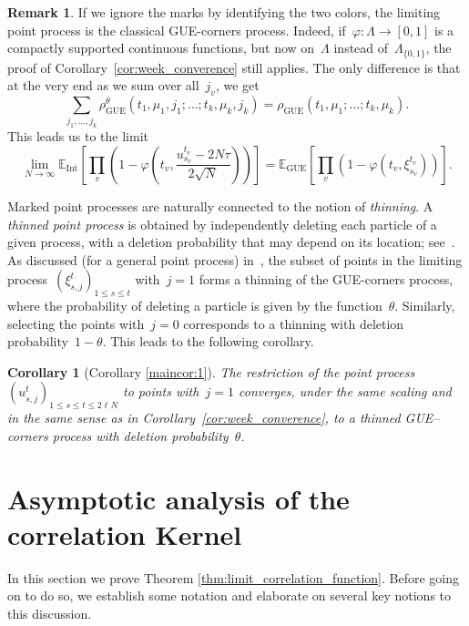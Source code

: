 \documentclass[11pt]{article}
\theoremstyle{plain}
\newtheorem{corollary}[theorem]{Corollary}
\theoremstyle{definition}
\newtheorem{remark}[theorem]{Remark}
\numberwithin{equation}{section}
\newcommand{\EE}{\mathbb{E}}
\begin{document}
\begin{remark}\label{rmk:forget_marks}
If we ignore the marks by identifying the two colors, the limiting point process is the classical GUE-corners process. Indeed, if~$\varphi:\Lambda\to [0,1]$ is a compactly supported continuous functions, but now on~$\Lambda$ instead of~$\Lambda_{\{0,1\}}$, the proof of Corollary~\ref{cor:week_converence} still applies. The only difference is that at the very end as we sum over all~$j_v$, we get
\begin{equation}
\sum_{j_1,\dots,j_k}\rho_{\operatorname{GUE}}^\theta(t_1,\mu_1,j_1;\dots;t_k,\mu_k,j_k)=\rho_{\operatorname{GUE}}(t_1,\mu_1;\dots;t_k,\mu_k).
\end{equation}
This leads us to the limit
\begin{equation}
\lim_{N\to \infty}\EE_{\operatorname{Int}}\left[\prod_v \left(1-\varphi\left(t_v,\frac{u_{s_v}^{t_v}-2 N\tau }{2\sqrt{N}}\right)\right)\right]
=\EE_{\operatorname{GUE}}\left[\prod_v (1-\varphi(t_v,\xi_{s_v}^{t_v}))\right].
\end{equation}
\end{remark}


%

Marked point processes are naturally connected to the notion of \emph{thinning}. A \emph{thinned point process} is obtained by independently deleting each particle of a given process, with a deletion probability that may depend on its location; see~\cite{BP04, BP06}. As discussed (for a general point process) in~\cite{CG23}, the subset of points in the limiting process~$(\xi_{s,j}^t)_{1\leq s\leq t}$ with~$j=1$ forms a thinning of the GUE-corners process, where the probability of deleting a particle is given by the function~$\theta$. Similarly, selecting the points with~$j=0$ corresponds to a thinning with deletion probability~$1-\theta$. This leads to the following corollary.
\begin{corollary}[Corollary \ref{maincor:1}]\label{cor:thinned}
The restriction of the point process~$(u_{s,j}^t)_{1\leq s\leq t\leq 2\ell N}$ to points with~$j=1$ converges, under the same scaling and in the same sense as in Corollary~\ref{cor:week_converence}, to a thinned GUE–corners process with deletion probability~$\theta$.
\end{corollary}


\section{Asymptotic analysis of the correlation Kernel }\label{sec:steepest}
In this section we prove Theorem \ref{thm:limit_correlation_function}. Before going on to do so, we establish some notation and elaborate on several key notions to this discussion.
\end{document}
